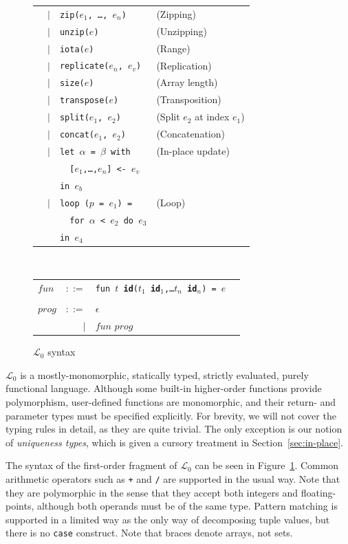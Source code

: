 \documentclass{sigplanconf}  %
\newcommand{\LO}{$\mathcal{L}_0$}
\begin{document}
\begin{figure}[bt]
\begin{tabular}{lrll}
& $|$ & {\tt zip($e_{1}$, \ldots, $e_{n}$)} & (Zipping) \\
& $|$ & {\tt unzip($e$)} & (Unzipping) \\
& $|$ & {\tt iota($e$)} & (Range) \\
& $|$ & {\tt replicate($e_{n}$, $e_{v}$)} & (Replication) \\
& $|$ & {\tt size($e$)} & (Array length) \\
& $|$ & {\tt transpose($e$)} & (Transposition) \\
& $|$ & {\tt split($e_{1}$, $e_{2}$)} & (Split $e_{2}$ at index $e_{1}$) \\
& $|$ & {\tt concat($e_{1}$, $e_{2}$)} & (Concatenation) \\
& $|$ & {\tt let $\alpha$ = $\beta$ with} & (In-place update) \\
&     & {\tt \ \ [$e_{1}$,\ldots,$e_{n}$] <- $e_{v}$} \\
&     & {\tt in $e_{b}$} \\
& $|$ & {\tt loop ($p$ = $e_{1}$) =} & (Loop) \\
&     & {\tt \ \ for $\alpha$ < $e_{2}$ do $e_{3}$} \\
&     & {\tt in $e_{4}$} \\
\end{tabular}
\\
\begin{tabular}{lrll}
$fun$ & $::=$ & {\tt fun $t$ {\bf id}($t_{1}$ {\bf id}$_{1}$,\ldots $t_{n}$ {\bf id}$_{n}$) = $e$} \\
\\
$prog$ & $::=$ & $\epsilon$ \\
       & $|$   & $fun$ $prog$
\end{tabular}
\caption{\LO{} syntax}
\label{fig:fo-syntax}
\end{figure}

\LO{} is a mostly-monomorphic, statically typed, strictly evaluated,
purely functional language.  Although some built-in higher-order
functions provide polymorphism, user-defined functions are
monomorphic, and their return- and parameter types must be specified
explicitly.  For brevity, we will not cover the typing
rules in detail, as they are quite trivial.  The only exception is our
notion of {\em uniqueness types}, which is given a cursory treatment
in Section~\ref{sec:in-place}.

The syntax of the first-order fragment of \LO{} can be seen in Figure~\ref{fig:fo-syntax}.  
Common arithmetic operators such as {\tt +} and
{\tt /} are supported in the usual way.  Note that they are
polymorphic in the sense that they accept both integers and
floating-points, although both operands must be of the same type.
Pattern matching is supported in a limited way as the only way of
decomposing tuple values, but there is no {\tt case} construct.  
Note that braces denote arrays, not sets.
\end{document}
